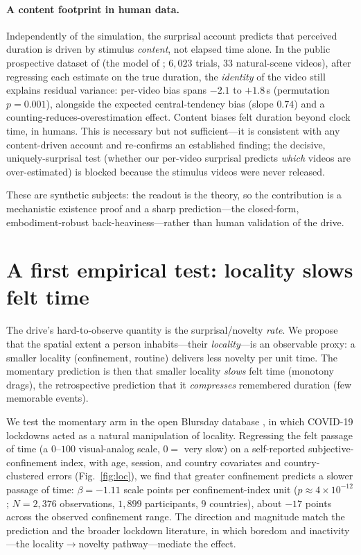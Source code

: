 \documentclass[11pt]{article}
\begin{document}
\paragraph{A content footprint in human data.}
Independently of the simulation, the surprisal account predicts that perceived
duration is driven by stimulus \emph{content}, not elapsed time alone. In the
public prospective dataset of \citet{fountas2022predictive} (the model of
\citet{roseboom2019activity}; $6{,}023$ trials, $33$ natural-scene videos), after
regressing each estimate on the true duration, the \emph{identity} of the video
still explains residual variance: per-video bias spans $-2.1$ to $+1.8$\,s
(permutation $p=0.001$), alongside the expected central-tendency bias (slope $0.74$)
and a counting-reduces-overestimation effect. Content biases felt duration beyond
clock time, in humans. This is necessary but not sufficient---it is consistent with
any content-driven account and re-confirms an established finding; the decisive,
uniquely-surprisal test (whether our per-video surprisal predicts \emph{which}
videos are over-estimated) is blocked because the stimulus videos were never
released.

These are synthetic subjects: the readout is the theory, so the contribution is a
mechanistic existence proof and a sharp prediction---the closed-form,
embodiment-robust back-heaviness---rather than human validation of the drive.

\section{A first empirical test: locality slows felt time}\label{sec:locality}
The drive's hard-to-observe quantity is the surprisal/novelty \emph{rate}. We propose
that the spatial extent a person inhabits---their \emph{locality}---is an observable
proxy: a smaller locality (confinement, routine) delivers less novelty per unit time.
The momentary prediction is then that smaller locality \emph{slows} felt time
(monotony drags), the retrospective prediction that it \emph{compresses} remembered
duration (few memorable events).

We test the momentary arm in the open Blursday database \citep{chaumon2022blursday},
in which COVID-19 lockdowns acted as a natural manipulation of locality. Regressing the
felt passage of time (a $0$--$100$ visual-analog scale, $0=$ very slow) on a
self-reported subjective-confinement index, with age, session, and country covariates
and country-clustered errors (Fig.~\ref{fig:loc}), we find that greater confinement
predicts a slower passage of time: $\beta = -1.11$ scale points per confinement-index
unit ($p\approx4\times10^{-12}$; $N=2{,}376$ observations, $1{,}899$ participants, $9$
countries), about $-17$ points across the observed confinement range. The direction and
magnitude match the prediction and the broader lockdown literature, in which boredom and
inactivity---the locality$\to$novelty pathway---mediate the effect.
\end{document}
